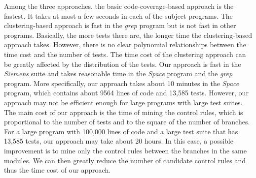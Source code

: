 \documentclass{sig-alternate}
\begin{document}
\begin{table}[t]
\caption{Efficiency of Our Approach
(\emph{seconds})}\label{tab:effi} %
\end{table}


Among the three approaches, the basic code-coverage-based approach
is the fastest. It takes at most a few seconds in each of the
subject programs. The clustering-based approach is fast in the
\emph{grep} program but is not fast in other programs. Basically,
the more tests there are, the longer time the clustering-based
approach takes. However, there is no clear polynomial relationships
between the time cost and the number of tests. The time cost of the
clustering approach can be greatly affected by the distribution of
the tests. Our approach is fast in the \emph{Siemens} suite and
takes reasonable time in the \emph{Space} program and the
\emph{grep} program. More specifically, our approach takes about 10
minutes in the \emph{Space} program, which contains about 9564 lines
of code and 13,585 tests. However, our approach may not be efficient
enough for large programs with large test suites. The main cost of
our approach is the time of mining the control rules, which is
proportional to the number of tests and to the square of the number
of branches. For a large program with 100,000 lines of code and a
large test suite that has 13,585 tests, our approach may take about
20 hours. In this case, a possible improvement is to mine only the
control rules between the branches in the same modules. We can then
greatly reduce the number of candidate control rules and thus the
time cost of our approach.
\end{document}
